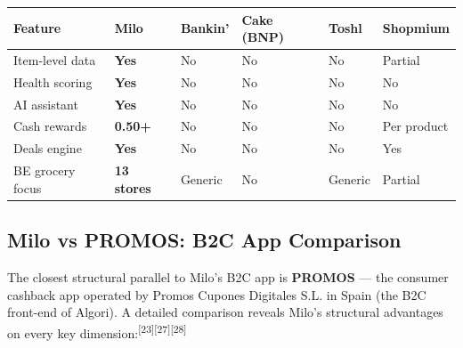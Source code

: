 \documentclass[11pt,a4paper]{article}
\begin{document}
\begin{center}
\renewcommand{\arraystretch}{1.3}
\begin{tabularx}{\textwidth}{L{3cm} C{1.8cm} C{1.8cm} C{2cm} C{1.8cm} C{1.8cm}}
\toprule
{}
\textbf{\color{white}Feature} & \textbf{\color{white}Milo} & \textbf{\color{white}Bankin'} & \textbf{\color{white}Cake (BNP)} & \textbf{\color{white}Toshl} & \textbf{\color{white}Shopmium} \\
\midrule
Item-level data & \textbf{\color{milogreen}Yes} & \textcolor{milored}{No} & \textcolor{milored}{No} & \textcolor{milored}{No} & Partial \\
Health scoring & \textbf{\color{milogreen}Yes} & \textcolor{milored}{No} & \textcolor{milored}{No} & \textcolor{milored}{No} & \textcolor{milored}{No} \\
AI assistant & \textbf{\color{milogreen}Yes} & \textcolor{milored}{No} & \textcolor{milored}{No} & \textcolor{milored}{No} & \textcolor{milored}{No} \\
Cash rewards & \textbf{\color{milogreen}\texteuro{}0.50+} & \textcolor{milored}{No} & \textcolor{milored}{No} & \textcolor{milored}{No} & Per product \\
Deals engine & \textbf{\color{milogreen}Yes} & \textcolor{milored}{No} & \textcolor{milored}{No} & \textcolor{milored}{No} & Yes \\
BE grocery focus & \textbf{\color{milogreen}13 stores} & Generic & \textcolor{milored}{No} & Generic & Partial \\
\bottomrule
\end{tabularx}
\end{center}

\subsection{Milo vs PROMOS: B2C App Comparison}

The closest structural parallel to Milo's B2C app is \textbf{PROMOS} --- the consumer cashback app operated by Promos Cupones Digitales S.L. in Spain (the B2C front-end of Algori). A detailed comparison reveals Milo's structural advantages on every key dimension:\textsuperscript{[23][27][28]}
\end{document}
